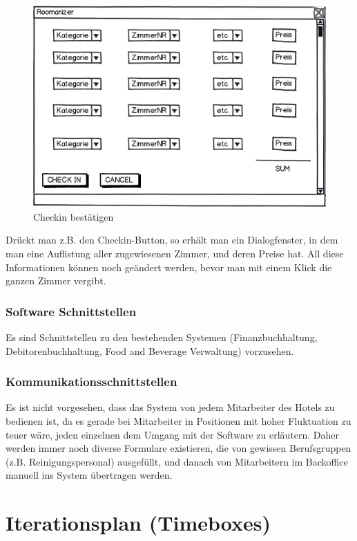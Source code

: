 \documentclass[10pt,a4paper,titlepage]{article}
\begin{document}
\begin{figure}[h]
	\includegraphics[width=\linewidth]{Images/GUI_Dialog.png}
	\caption{Checkin bestätigen}
\end{figure}

Drückt man z.B. den  \Gls{Checkin}-Button, so erhält man ein Dialogfenster, in dem man eine Auflistung aller zugewiesenen \Gls{Zimmer}, und deren Preise hat. All diese Informationen können noch geändert werden, bevor man mit einem Klick die ganzen \Gls{Zimmer} vergibt.
\subsubsection{Software Schnittstellen}
Es sind Schnittstellen zu den bestehenden Systemen (Finanzbuchhaltung, Debitorenbuchhaltung, Food and Beverage Verwaltung) vorzusehen.
\subsubsection{Kommunikationsschnittstellen}
Es ist nicht vorgesehen, dass das System von jedem \Gls{Mitarbeiter} des Hotels zu bedienen ist, da es gerade bei \Gls{Mitarbeiter} in Positionen mit hoher Fluktuation zu teuer wäre, jeden einzelnen dem Umgang mit der Software zu erläutern. Daher werden immer noch diverse Formulare existieren, die von gewissen Berufsgruppen (z.B. Reinigungspersonal) ausgefüllt, und danach von \Gls{Mitarbeiter}n im \Gls{Backoffice} manuell ins System übertragen werden.

\newpage

\section{Iterationsplan (Timeboxes)}


\newpage

\printglossary[title=Glossar,toctitle=GLOSSAR]

\newpage

\listoffigures
\end{document}
